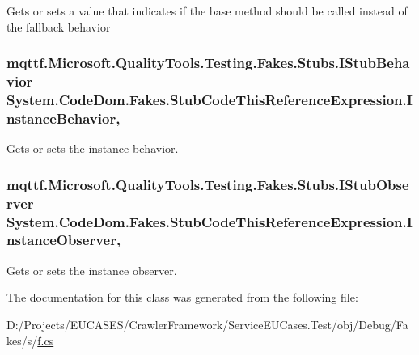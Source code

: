 Gets or sets a value that indicates if the base method should be called instead of the fallback behavior

\hypertarget{class_system_1_1_code_dom_1_1_fakes_1_1_stub_code_this_reference_expression_a07989292c97027d286ec0bebe208924e}{
\subsubsection[{Instance\-Behavior}]{\setlength{\rightskip}{0pt plus 5cm}mqttf.\-Microsoft.\-Quality\-Tools.\-Testing.\-Fakes.\-Stubs.\-I\-Stub\-Behavior System.\-Code\-Dom.\-Fakes.\-Stub\-Code\-This\-Reference\-Expression.\-Instance\-Behavior\hspace{0.3cm}{\ttfamily [get]}, {\ttfamily [set]}}}\label{class_system_1_1_code_dom_1_1_fakes_1_1_stub_code_this_reference_expression_a07989292c97027d286ec0bebe208924e}


Gets or sets the instance behavior.

\hypertarget{class_system_1_1_code_dom_1_1_fakes_1_1_stub_code_this_reference_expression_a68254101d8726045b862e46039627f7d}{
\subsubsection[{Instance\-Observer}]{\setlength{\rightskip}{0pt plus 5cm}mqttf.\-Microsoft.\-Quality\-Tools.\-Testing.\-Fakes.\-Stubs.\-I\-Stub\-Observer System.\-Code\-Dom.\-Fakes.\-Stub\-Code\-This\-Reference\-Expression.\-Instance\-Observer\hspace{0.3cm}{\ttfamily [get]}, {\ttfamily [set]}}}\label{class_system_1_1_code_dom_1_1_fakes_1_1_stub_code_this_reference_expression_a68254101d8726045b862e46039627f7d}


Gets or sets the instance observer.



The documentation for this class was generated from the following file\-:\begin{DoxyCompactItemize}
\item 
D\-:/\-Projects/\-E\-U\-C\-A\-S\-E\-S/\-Crawler\-Framework/\-Service\-E\-U\-Cases.\-Test/obj/\-Debug/\-Fakes/s/\hyperlink{s_2f_8cs}{f.\-cs}\end{DoxyCompactItemize}
